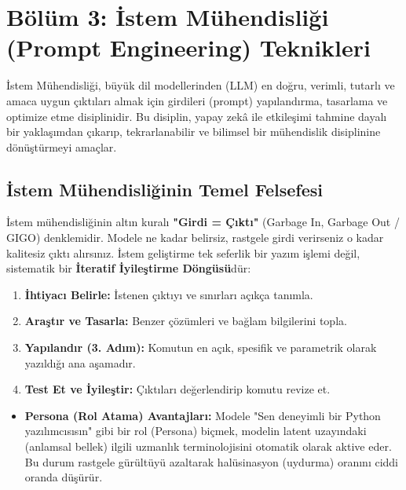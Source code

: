 \documentclass[11pt,a4paper,openany]{book}
\begin{document}
\newpage
\section{Bölüm 3: İstem Mühendisliği (Prompt Engineering) Teknikleri}
İstem Mühendisliği, büyük dil modellerinden (LLM) en doğru, verimli, tutarlı ve amaca uygun çıktıları almak için girdileri (prompt) yapılandırma, tasarlama ve optimize etme disiplinidir. Bu disiplin, yapay zekâ ile etkileşimi tahmine dayalı bir yaklaşımdan çıkarıp, tekrarlanabilir ve bilimsel bir mühendislik disiplinine dönüştürmeyi amaçlar.

\needspace{9cm}
\subsection{İstem Mühendisliğinin Temel Felsefesi}
İstem mühendisliğinin altın kuralı \textbf{"Girdi = Çıktı"} (Garbage In, Garbage Out / GIGO) denklemidir. Modele ne kadar belirsiz, rastgele girdi verirseniz o kadar kalitesiz çıktı alırsınız. İstem geliştirme tek seferlik bir yazım işlemi değil, sistematik bir \textbf{İteratif İyileştirme Döngüsü}dür:
\begin{enumerate}
    \item \textbf{İhtiyacı Belirle:} İstenen çıktıyı ve sınırları açıkça tanımla.
    \item \textbf{Araştır ve Tasarla:} Benzer çözümleri ve bağlam bilgilerini topla.
    \item \textbf{Yapılandır (3. Adım):} Komutun en açık, spesifik ve parametrik olarak yazıldığı ana aşamadır.
    \item \textbf{Test Et ve İyileştir:} Çıktıları değerlendirip komutu revize et.
\end{enumerate}
\begin{itemize}
    \item \textbf{Persona (Rol Atama) Avantajları:} Modele "Sen deneyimli bir Python yazılımcısısın" gibi bir rol (Persona) biçmek, modelin latent uzayındaki (anlamsal bellek) ilgili uzmanlık terminolojisini otomatik olarak aktive eder. Bu durum rastgele gürültüyü azaltarak halüsinasyon (uydurma) oranını ciddi oranda düşürür.
\end{itemize}

\needspace{9cm}
\end{document}
